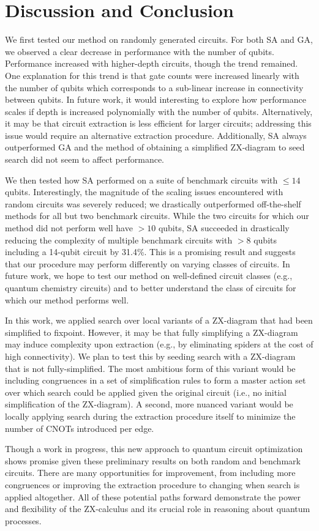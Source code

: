 \chapter[Discussion and Conclusion]{Discussion and Conclusion} \label{ch:discuss-conc}

We first tested our method on randomly generated circuits.
For both SA and GA, we observed a clear decrease in performance with the number of qubits.
Performance increased with higher-depth circuits, though the trend remained.
One explanation for this trend is that gate counts were increased linearly with the number of qubits which corresponds to a sub-linear increase in connectivity between qubits.
In future work, it would interesting to explore how performance scales if depth is increased polynomially with the number of qubits.
Alternatively, it may be that circuit extraction is less efficient for larger circuits;
addressing this issue would require an alternative extraction procedure.
Additionally, SA always outperformed GA and the method of obtaining a simplified ZX-diagram to seed search did not seem to affect performance.

We then tested how SA performed on a suite of benchmark circuits with $\leq 14$ qubits.
Interestingly, the magnitude of the scaling issues encountered with random circuits was severely reduced;
we drastically outperformed off-the-shelf methods for all but two benchmark circuits.
While the two circuits for which our method did not perform well have $>10$ qubits, SA succeeded in drastically reducing the complexity of multiple benchmark circuits with $>8$ qubits including a 14-qubit circuit by 31.4\%.
This is a promising result and suggests that our procedure may perform differently on varying classes of circuits.
In future work, we hope to test our method on well-defined circuit classes (e.g., quantum chemistry circuits) and to better understand the class of circuits for which our method performs well.


In this work, we applied search over local variants of a ZX-diagram that had been simplified to fixpoint.
However, it may be that fully simplifying a ZX-diagram may induce complexity upon extraction (e.g., by eliminating spiders at the cost of high connectivity).
We plan to test this by seeding search with a ZX-diagram that is not fully-simplified.
The most ambitious form of this variant would be including congruences in a set of simplification rules to form a master action set over which search could be applied given the original circuit (i.e., no initial simplification of the ZX-diagram).
A second, more nuanced variant would be locally applying search during the extraction procedure itself to minimize the number of CNOTs introduced per edge.

Though a work in progress, this new approach to quantum circuit optimization shows promise given these preliminary results on both random and benchmark circuits.
There are many opportunities for improvement, from including more congruences or improving the extraction procedure to changing when search is applied altogether.
All of these potential paths forward demonstrate the power and flexibility of the ZX-calculus and its crucial role in reasoning about quantum processes.

